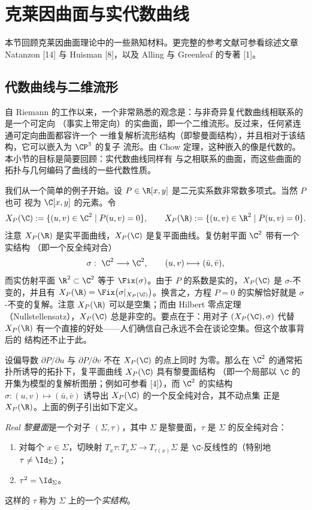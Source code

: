 \section{克莱因曲面与实代数曲线}
\label{sec:02.1}

本节回顾克莱因曲面理论中的一些熟知材料。更完整的参考文献可参看综述文章
Natanzon [14] 与 Huisman [8]，以及 Alling 与 Greenleaf 的专著 [1]。

\subsection{代数曲线与二维流形}
\label{sec:02.1.1}

自 Riemann 的工作以来，一个非常熟悉的观念是：与非奇异复代数曲线相联系的是一个可定向
（事实上带定向）的实曲面，即一个二维流形。反过来，任何紧连通可定向曲面都容许一个
一维复解析流形结构（即黎曼面结构），并且相对于该结构，它可以嵌入为 $\CP^3$ 的复子
流形。由 Chow 定理，这种嵌入的像是代数的。本小节的目标是简要回顾：实代数曲线同样有
与之相联系的曲面，而这些曲面的拓扑与几何编码了曲线的一些代数性质。

我们从一个简单的例子开始。设 $P\in\R[x,y]$ 是二元实系数非常数多项式。当然 $P$ 也可
视为 $\C[x,y]$ 的元素。令
\[
X_P(\C):=\{(u,v)\in\C^2\mid P(u,v)=0\},
\qquad
X_P(\R):=\{(u,v)\in\R^2\mid P(u,v)=0\}.
\]
注意 $X_P(\R)$ 是实平面曲线，$X_P(\C)$ 是复平面曲线。复仿射平面 $\C^2$ 带有一个实结构
（即一个反全纯对合）
\[
\sigma:\ \C^2\longrightarrow\C^2,\qquad (u,v)\longmapsto(\bar u,\bar v),
\]
而实仿射平面 $\R^2\subset\C^2$ 等于 $\Fix(\sigma)$。由于 $P$ 的系数是实的，$X_P(\C)$
是 $\sigma$-不变的，并且有 $X_P(\R)=\Fix\bigl(\sigma|_{X_P(\C)}\bigr)$。换言之，方程
$P=0$ 的实解恰好就是 $\sigma$-不变的复解。注意 $X_P(\R)$ 可以是空集；而由 Hilbert
零点定理（Nullstellensatz），$X_P(\C)$ 总是非空的。要点在于：用对子 $(X_P(\C),\sigma)$
代替 $X_P(\R)$ 有一个直接的好处——人们确信自己永远不会在谈论空集。但这个故事背后的
结构还不止于此。

设偏导数 $\partial P/\partial u$ 与 $\partial P/\partial v$ 不在 $X_P(\C)$ 的点上同时
为零。那么在 $\C^2$ 的通常拓扑所诱导的拓扑下，复平面曲线 $X_P(\C)$ 具有黎曼面结构
（即一个局部以 $\C$ 的开集为模型的复解析图册；例如可参看 [4]），而 $\C^2$ 的实结构
$\sigma:(u,v)\mapsto(\bar u,\bar v)$ 诱导出 $X_P(\C)$ 的一个反全纯对合，其不动点集
正是 $X_P(\R)$。上面的例子引出如下定义。

\begin{definition}\label{def:2.1.1}
\emph{Real 黎曼面}是一个对子 $(\Sigma,\tau)$，其中 $\Sigma$ 是黎曼面，$\tau$ 是 $\Sigma$
的反全纯对合：
\begin{enumerate}[label=(\roman*), leftmargin=2.2em, itemsep=0.15em]
\item 对每个 $x\in\Sigma$，切映射 $T_x\tau:T_x\Sigma\to T_{\tau(x)}\Sigma$ 是
      $\C$-反线性的（特别地 $\tau\neq\Id_\Sigma$）；
\item $\tau^2=\Id_\Sigma$。
\end{enumerate}
这样的 $\tau$ 称为 $\Sigma$ 上的一个\emph{实结构}。
\end{definition}

